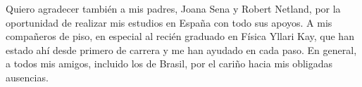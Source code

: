 Quiero agradecer también a mis padres, Joana Sena y Robert Netland, por la oportunidad 
de realizar mis estudios en España con todo sus apoyos. A mis compañeros de piso,
en especial al recién graduado en Física Yllari Kay, que han estado ahí desde 
primero de carrera y me han ayudado en cada paso. En general, a todos mis amigos, incluido los de Brasil,
por el cariño hacia mis obligadas ausencias. 
